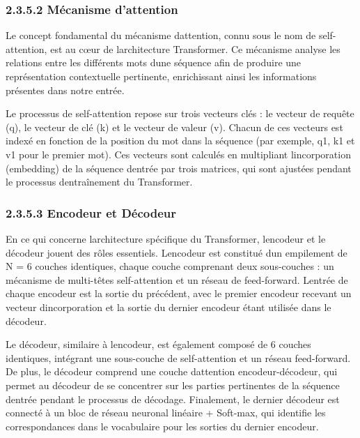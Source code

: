 \documentclass[
]{article}
\begin{document}
\subsubsection{2.3.5.2 Mécanisme
d'attention}\label{muxe9canisme-dattention}

Le concept fondamental du mécanisme d\textquotesingle attention, connu
sous le nom de self-attention, est au cœur de
l\textquotesingle architecture Transformer. Ce mécanisme analyse les
relations entre les différents mots d\textquotesingle une séquence afin
de produire une représentation contextuelle pertinente, enrichissant
ainsi les informations présentes dans notre entrée.

Le processus de self-attention repose sur trois vecteurs clés : le
vecteur de requête (q), le vecteur de clé (k) et le vecteur de valeur
(v). Chacun de ces vecteurs est indexé en fonction de la position du mot
dans la séquence (par exemple, q1, k1 et v1 pour le premier mot). Ces
vecteurs sont calculés en multipliant l\textquotesingle incorporation
(embedding) de la séquence d\textquotesingle entrée par trois matrices,
qui sont ajustées pendant le processus d\textquotesingle entraînement du
Transformer.

\subsubsection{2.3.5.3 Encodeur et
Décodeur}\label{encodeur-et-duxe9codeur}

En ce qui concerne l\textquotesingle architecture spécifique du
Transformer, l\textquotesingle encodeur et le décodeur jouent des rôles
essentiels. L\textquotesingle encodeur est constitué
d\textquotesingle un empilement de N = 6 couches identiques, chaque
couche comprenant deux sous-couches : un mécanisme de multi-têtes
self-attention et un réseau de feed-forward. L\textquotesingle entrée de
chaque encodeur est la sortie du précédent, avec le premier encodeur
recevant un vecteur d\textquotesingle incorporation et la sortie du
dernier encodeur étant utilisée dans le décodeur.

Le décodeur, similaire à l\textquotesingle encodeur, est également
composé de 6 couches identiques, intégrant une sous-couche de
self-attention et un réseau feed-forward. De plus, le décodeur comprend
une couche d\textquotesingle attention encodeur-décodeur, qui permet au
décodeur de se concentrer sur les parties pertinentes de la séquence
d\textquotesingle entrée pendant le processus de décodage. Finalement,
le dernier décodeur est connecté à un bloc de réseau neuronal linéaire +
Soft-max, qui identifie les correspondances dans le vocabulaire pour les
sorties du dernier encodeur.
\end{document}

